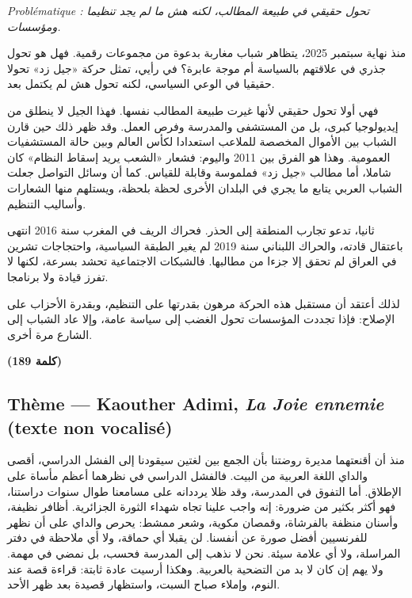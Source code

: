 \documentclass[11pt,a4paper]{article}
\begin{document}
\emph{Problématique : تحول حقيقي في طبيعة المطالب، لكنه هش ما لم يجد تنظيما ومؤسسات.}

منذ نهاية سبتمبر 2025، يتظاهر شباب مغاربة بدعوة من مجموعات رقمية. فهل هو تحول جذري في علاقتهم بالسياسة أم موجة عابرة؟ في رأيي، تمثل حركة «جيل زد» تحولا حقيقيا في الوعي السياسي، لكنه تحول هش لم يكتمل بعد.

فهي أولا تحول حقيقي لأنها غيرت طبيعة المطالب نفسها. فهذا الجيل لا ينطلق من إيديولوجيا كبرى، بل من المستشفى والمدرسة وفرص العمل. وقد ظهر ذلك حين قارن الشباب بين الأموال المخصصة للملاعب استعدادا لكأس العالم وبين حالة المستشفيات العمومية. وهذا هو الفرق بين 2011 واليوم: فشعار «الشعب يريد إسقاط النظام» كان شاملا، أما مطالب «جيل زد» فملموسة وقابلة للقياس. كما أن وسائل التواصل جعلت الشباب العربي يتابع ما يجري في البلدان الأخرى لحظة بلحظة، ويستلهم منها الشعارات وأساليب التنظيم.

ثانيا، تدعو تجارب المنطقة إلى الحذر. فحراك الريف في المغرب سنة 2016 انتهى باعتقال قادته، والحراك اللبناني سنة 2019 لم يغير الطبقة السياسية، واحتجاجات تشرين في العراق لم تحقق إلا جزءا من مطالبها. فالشبكات الاجتماعية تحشد بسرعة، لكنها لا تفرز قيادة ولا برنامجا.

لذلك أعتقد أن مستقبل هذه الحركة مرهون بقدرتها على التنظيم، وبقدرة الأحزاب على الإصلاح: فإذا تجددت المؤسسات تحول الغضب إلى سياسة عامة، وإلا عاد الشباب إلى الشارع مرة أخرى.

\textbf{(189 كلمة)}

\hypertarget{thuxe8me-kaouther-adimi-la-joie-ennemie-texte-non-vocalisuxe9}{%
\subsection{\texorpdfstring{Thème --- Kaouther Adimi, \emph{La Joie ennemie} (texte non vocalisé)}{Thème --- Kaouther Adimi, La Joie ennemie (texte non vocalisé)}}\label{thuxe8me-kaouther-adimi-la-joie-ennemie-texte-non-vocalisuxe9}}

منذ أن أقنعتهما مديرة روضتنا بأن الجمع بين لغتين سيقودنا إلى الفشل الدراسي، أقصى والداي اللغة العربية من البيت. فالفشل الدراسي في نظرهما أعظم مأساة على الإطلاق. أما التفوق في المدرسة، وقد ظلا يرددانه على مسامعنا طوال سنوات دراستنا، فهو أكثر بكثير من ضرورة: إنه واجب علينا تجاه شهداء الثورة الجزائرية. أظافر نظيفة، وأسنان منظفة بالفرشاة، وقمصان مكوية، وشعر ممشط: يحرص والداي على أن نظهر للفرنسيين أفضل صورة عن أنفسنا. لن يقبلا أي حماقة، ولا أي ملاحظة في دفتر المراسلة، ولا أي علامة سيئة. نحن لا نذهب إلى المدرسة فحسب، بل نمضي في مهمة. ولا يهم إن كان لا بد من التضحية بالعربية. وهكذا أرسيت عادة ثابتة: قراءة قصة عند النوم، وإملاء صباح السبت، واستظهار قصيدة بعد ظهر الأحد.
\end{document}
